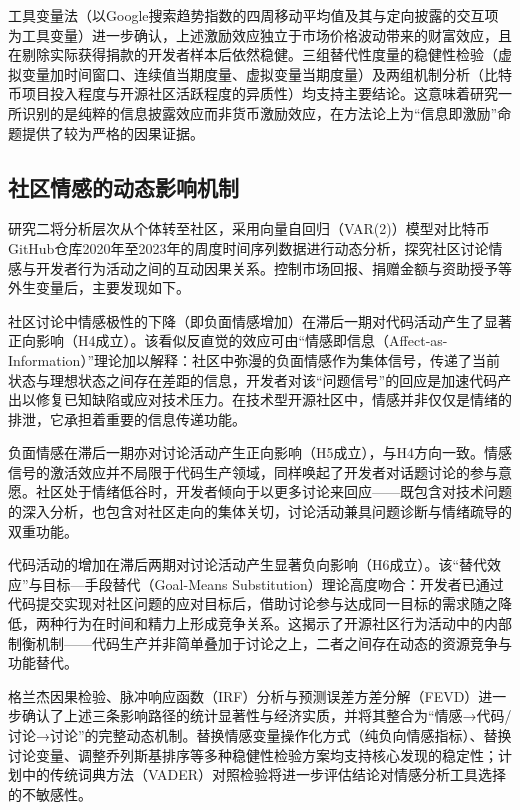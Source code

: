 工具变量法（以Google搜索趋势指数的四周移动平均值及其与定向披露的交互项为工具变量）进一步确认，上述激励效应独立于市场价格波动带来的财富效应，且在剔除实际获得捐款的开发者样本后依然稳健。三组替代性度量的稳健性检验（虚拟变量加时间窗口、连续值当期度量、虚拟变量当期度量）及两组机制分析（比特币项目投入程度与开源社区活跃程度的异质性）均支持主要结论。这意味着研究一所识别的是纯粹的信息披露效应而非货币激励效应，在方法论上为“信息即激励”命题提供了较为严格的因果证据。

\subsection{社区情感的动态影响机制}

研究二将分析层次从个体转至社区，采用向量自回归（VAR(2)）模型对比特币GitHub仓库2020年至2023年的周度时间序列数据进行动态分析，探究社区讨论情感与开发者行为活动之间的互动因果关系。控制市场回报、捐赠金额与资助授予等外生变量后，主要发现如下。

社区讨论中情感极性的下降（即负面情感增加）在滞后一期对代码活动产生了显著正向影响（H4成立）。该看似反直觉的效应可由“情感即信息（Affect-as-Information）”理论加以解释\cite{schwarz1983moods}：社区中弥漫的负面情感作为集体信号，传递了当前状态与理想状态之间存在差距的信息，开发者对该“问题信号”的回应是加速代码产出以修复已知缺陷或应对技术压力。在技术型开源社区中，情感并非仅仅是情绪的排泄，它承担着重要的信息传递功能。

负面情感在滞后一期亦对讨论活动产生正向影响（H5成立），与H4方向一致。情感信号的激活效应并不局限于代码生产领域，同样唤起了开发者对话题讨论的参与意愿。社区处于情绪低谷时，开发者倾向于以更多讨论来回应——既包含对技术问题的深入分析，也包含对社区走向的集体关切，讨论活动兼具问题诊断与情绪疏导的双重功能。

代码活动的增加在滞后两期对讨论活动产生显著负向影响（H6成立）。该“替代效应”与目标—手段替代（Goal-Means Substitution）理论高度吻合\cite{kruglanski2002theory}：开发者已通过代码提交实现对社区问题的应对目标后，借助讨论参与达成同一目标的需求随之降低，两种行为在时间和精力上形成竞争关系。这揭示了开源社区行为活动中的内部制衡机制——代码生产并非简单叠加于讨论之上，二者之间存在动态的资源竞争与功能替代。

格兰杰因果检验、脉冲响应函数（IRF）分析与预测误差方差分解（FEVD）进一步确认了上述三条影响路径的统计显著性与经济实质，并将其整合为“情感→代码/讨论→讨论”的完整动态机制。替换情感变量操作化方式（纯负向情感指标）、替换讨论变量、调整乔列斯基排序等多种稳健性检验方案均支持核心发现的稳定性；计划中的传统词典方法（VADER）对照检验将进一步评估结论对情感分析工具选择的不敏感性。

